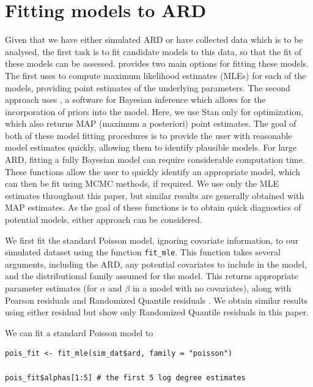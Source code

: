 \hypertarget{sec:fitting}{%
\section{Fitting models to ARD}\label{sec:fitting}}

Given that we have either simulated ARD or have collected data which
is to be analysed, the first task
is to fit candidate models to this data,
so that the fit of these models can be
assessed.  provides two main options for
fitting these models.
The first uses  \citep[\citet{glmmtmb2}]{glmmtmb1} to compute maximum
likelihood estimates (MLEs) for each of the models, providing point estimates
of the underlying parameters.
The second approach uses  \citep{rstan},
a software for Bayesian inference which allows for the incorporation
of priors into the model. Here, we use Stan only for optimization,
which also returns MAP (maximum a posteriori) point estimates.
The goal of both of these model fitting procedures is to provide the
user with reasonable model estimates quickly, allowing them to
identify plausible models. For large ARD, fitting a fully Bayesian
model can require considerable computation time.
These functions
allow the user to quickly identify an appropriate model,
which can then be fit using MCMC methods, if required.
We use only the MLE estimates throughout
this paper, but similar results are generally obtained with MAP estimates.
As the goal of these functions is to obtain quick diagnostics of potential
models, either approach can be considered.

We first fit the standard Poisson model, ignoring covariate information,
to our simulated dataset using the function \texttt{fit\_mle}.
This function takes several arguments, including the ARD, any potential covariates
to include in the model, and the distributional family assumed
for the model.
This returns appropriate parameter
estimates (for \(\alpha\) and \(\beta\) in a model with no covariates), along
with Pearson residuals \citep{mccullagh1989generalized}
and Randomized Quantile residuals \citep{dunn1996randomized}.
We obtain similar results using either residual but show only Randomized
Quantile residuals in this paper.

We can fit a standard Poisson model to

\begin{verbatim}
pois_fit <- fit_mle(sim_dat$ard, family = "poisson")

pois_fit$alphas[1:5] # the first 5 log degree estimates
\end{verbatim}

